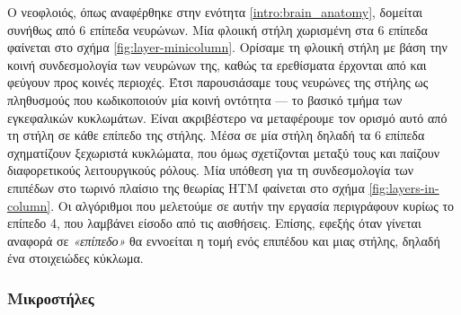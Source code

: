 	Ο νεοφλοιός, όπως αναφέρθηκε στην ενότητα \ref{intro:brain_anatomy}, δομείται συνήθως από 6 επίπεδα νευρώνων.
	Μία φλοιική στήλη χωρισμένη στα 6 επίπεδα φαίνεται στο σχήμα \ref{fig:layer-minicolumn}.
	Ορίσαμε τη φλοιική στήλη με βάση την κοινή συνδεσμολογία των νευρώνων της, καθώς τα ερεθίσματα έρχονται από και φεύγουν προς κοινές περιοχές.
	Έτσι παρουσιάσαμε τους νευρώνες της στήλης ως πληθυσμούς που κωδικοποιούν μία κοινή οντότητα --- το βασικό τμήμα των εγκεφαλικών κυκλωμάτων.
	Είναι ακριβέστερο να μεταφέρουμε τον ορισμό αυτό από τη στήλη σε κάθε επίπεδο της στήλης.
	Μέσα σε μία στήλη δηλαδή τα 6 επίπεδα σχηματίζουν ξεχωριστά κυκλώματα, που όμως σχετίζονται μεταξύ τους και παίζουν διαφορετικούς λειτουργικούς ρόλους.
	Μία υπόθεση για τη συνδεσμολογία των επιπέδων στο τωρινό πλαίσιο της θεωρίας HTM φαίνεται στο σχήμα \ref{fig:layers-in-column}.
	Οι αλγόριθμοι που μελετούμε σε αυτήν την εργασία περιγράφουν κυρίως το επίπεδο 4, που λαμβάνει είσοδο από τις αισθήσεις.
	Επίσης, εφεξής όταν γίνεται αναφορά σε \textit{«επίπεδο»} θα εννοείται η τομή ενός επιπέδου και μιας στήλης, δηλαδή ένα στοιχειώδες κύκλωμα.

	\subsubsection{Μικροστήλες}

